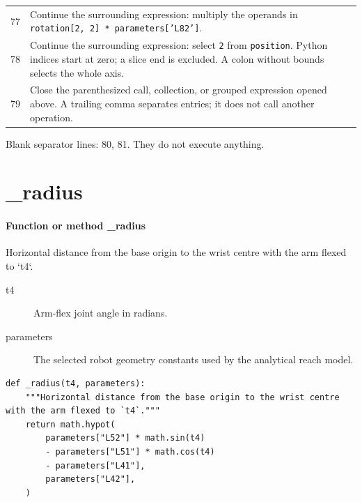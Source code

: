 \documentclass[11pt,a4paper]{book}
\begin{document}
\begin{longtable}{r p{}}
77 & Continue the surrounding expression: multiply the operands in \texttt{rotation[2, 2] * parameters['L82']}. \\

78 & Continue the surrounding expression: select \texttt{2} from \texttt{position}. Python indices start at zero; a slice end is excluded. A colon without bounds selects the whole axis. \\

79 & Close the parenthesized call, collection, or grouped expression opened above. A trailing comma separates entries; it does not call another operation. \\

\end{longtable}

Blank separator lines: 80, 81. They do not execute anything.

\section{\_radius}

\paragraph{Function or method \_radius}
Horizontal distance from the base origin to the wrist centre with the arm flexed to `t4`.

\begin{description}
\item[t4] Arm-flex joint angle in radians.
\item[parameters] The selected robot geometry constants used by the analytical reach model.
\end{description}

\begin{lstlisting}[firstnumber=82]
def _radius(t4, parameters):
    """Horizontal distance from the base origin to the wrist centre with the arm flexed to `t4`."""
    return math.hypot(
        parameters["L52"] * math.sin(t4)
        - parameters["L51"] * math.cos(t4)
        - parameters["L41"],
        parameters["L42"],
    )


\end{lstlisting}
\end{document}
